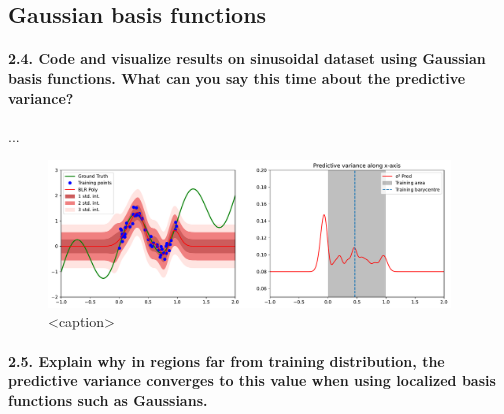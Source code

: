 \subsection{Gaussian basis functions}

\paragraph*{2.4. Code and visualize results on sinusoidal dataset using Gaussian basis functions. What can you say this time about the predictive variance?}

...

\begin{figure}[H]
    \centering
    \includegraphics[width=0.95\textwidth]{phi_gaussian.pdf}
    \caption{<caption>}
    \label{fig:phi_gaussian}
\end{figure}

\paragraph*{2.5. Explain why in regions far from training distribution, the predictive variance converges to this value when using localized basis functions such as Gaussians.}


